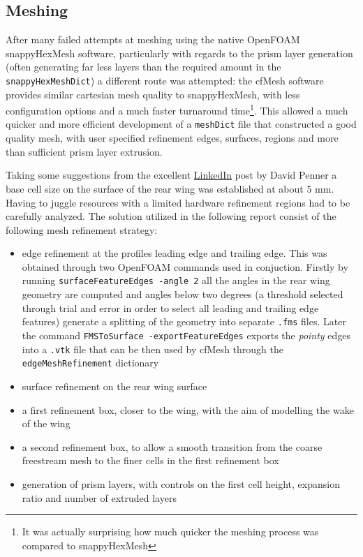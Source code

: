 \documentclass[12pt,a4paper]{article}
\begin{document}
\subsection{Meshing}

After many failed attempts at meshing using the native OpenFOAM snappyHexMesh software, particularly with regards to the prism layer generation (often generating far less layers than the required amount in the \texttt{snappyHexMeshDict}) a different route was attempted: the cfMesh software provides similar cartesian mesh quality to snappyHexMesh, with less configuration options and a much faster turnaround time\footnote{It was actually surprising how much quicker the meshing process was compared to snappyHexMesh}. This allowed a much quicker and more efficient development of a \texttt{meshDict} file that constructed a good quality mesh, with user specified refinement edges, surfaces, regions and more than sufficient prism layer extrusion.

Taking some suggestions from the excellent \href{https://www.linkedin.com/pulse/simulating-williams-fw43bar-part-1-all-simulations-wrong-david-penner/}{LinkedIn} post by David Penner a base cell size on the surface of the rear wing was established at about 5 mm. Having to juggle resources with a limited hardware refinement regions had to be carefully analyzed. The solution utilized in the following report consist of the following mesh refinement strategy:

\begin{itemize}
    \item edge refinement at the profiles leading edge and trailing edge. This was obtained through two OpenFOAM commands used in conjuction. Firstly by running \texttt{surfaceFeatureEdges -angle 2} all the angles in the rear wing geometry are computed and angles below two degrees (a threshold selected through trial and error in order to select all leading and trailing edge features) generate a splitting of the geometry into separate \texttt{.fms} files. Later the command \texttt{FMSToSurface -exportFeatureEdges} exports the \textit{pointy} edges into a \texttt{.vtk} file that can be then used by cfMesh through the \texttt{edgeMeshRefinement} dictionary
    \item surface refinement on the rear wing  surface
    \item a first refinement box, closer to the wing, with the aim of modelling the wake of the wing
    \item a second refinement box, to allow a smooth transition from the coarse freestream mesh to the finer cells in the first refinement box
    \item generation of prism layers, with controls on the first cell height, expansion ratio and number of extruded layers
\end{itemize}
\end{document}
